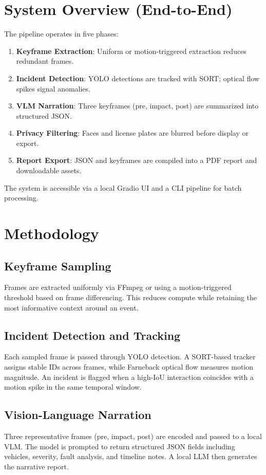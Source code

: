 \documentclass[conference]{IEEEtran}
\begin{document}
\section{System Overview (End-to-End)}
The pipeline operates in five phases:
\begin{enumerate}
    \item \textbf{Keyframe Extraction}: Uniform or motion-triggered extraction reduces redundant frames.
    \item \textbf{Incident Detection}: YOLO detections are tracked with SORT; optical flow spikes signal anomalies.
    \item \textbf{VLM Narration}: Three keyframes (pre, impact, post) are summarized into structured JSON.
    \item \textbf{Privacy Filtering}: Faces and license plates are blurred before display or export.
    \item \textbf{Report Export}: JSON and keyframes are compiled into a PDF report and downloadable assets.
\end{enumerate}
The system is accessible via a local Gradio UI and a CLI pipeline for batch processing.

\section{Methodology}
\subsection{Keyframe Sampling}
Frames are extracted uniformly via FFmpeg or using a motion-triggered threshold based on frame differencing. This reduces compute while retaining the most informative context around an event.

\subsection{Incident Detection and Tracking}
Each sampled frame is passed through YOLO detection. A SORT-based tracker assigns stable IDs across frames, while Farneback optical flow measures motion magnitude. An incident is flagged when a high-IoU interaction coincides with a motion spike in the same temporal window.

\subsection{Vision-Language Narration}
Three representative frames (pre, impact, post) are encoded and passed to a local VLM. The model is prompted to return structured JSON fields including vehicles, severity, fault analysis, and timeline notes. A local LLM then generates the narrative report.
\end{document}
